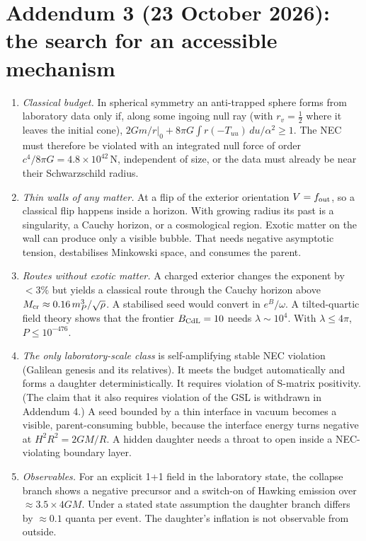 \documentclass[11pt,a4paper]{article}
\theoremstyle{remark}\newtheorem{remark}[theorem]{Remark}
\begin{document}
\section*{Addendum 3 (23 October 2026): the search for an accessible mechanism}
\begin{enumerate}
\item \emph{Classical budget.} In spherical symmetry an anti-trapped sphere forms from laboratory data only if, along some ingoing null ray (with $r_v=\tfrac12$
where it leaves the initial cone), $2Gm/r|_0+8\pi G\int r(-T_{uu})\,du/\alpha^2\ge1$. The NEC must therefore be violated with an integrated null force of order
$c^4/8\pi G=4.8\times10^{42}$\,N, independent of size, or the data must already be near their Schwarzschild radius.
\item \emph{Thin walls of any matter.} At a flip of the exterior orientation $V=f_{\rm out}$, so a classical flip happens inside a horizon. With growing radius its past
is a singularity, a Cauchy horizon, or a cosmological region. Exotic matter on the wall can produce only a visible bubble. That needs negative asymptotic
tension, destabilises Minkowski space, and consumes the parent.
\item \emph{Routes without exotic matter.} A charged exterior changes the exponent by $<3\%$ but yields a classical route through the Cauchy horizon above
$M_{\rm cr}\approx0.16\,m_P^3/\sqrt\rho$. A stabilised seed would convert in $e^B/\omega$. A tilted-quartic field theory shows that the frontier $B_{\rm CdL}=10$
needs $\lambda\sim10^4$. With $\lambda\le4\pi$, $P\le10^{-476}$.
\item \emph{The only laboratory-scale class} is self-amplifying stable NEC violation (Galilean genesis and its relatives). It meets the budget automatically and forms
a daughter deterministically. It requires violation of S-matrix positivity. (The claim that it also requires violation of the GSL is withdrawn in Addendum 4.) A seed bounded by a thin interface in vacuum
becomes a visible, parent-consuming bubble, because the interface energy turns negative at $H^2R^2=2GM/R$. A hidden daughter needs a throat to open inside
a NEC-violating boundary layer.
\item \emph{Observables.} For an explicit 1+1 field in the laboratory state, the collapse branch shows a negative precursor and a switch-on of Hawking emission
over $\approx3.5\times4GM$. Under a stated state assumption the daughter branch differs by $\approx0.1$ quanta per event. The daughter's inflation is not observable
from outside.
\end{enumerate}
\end{document}
